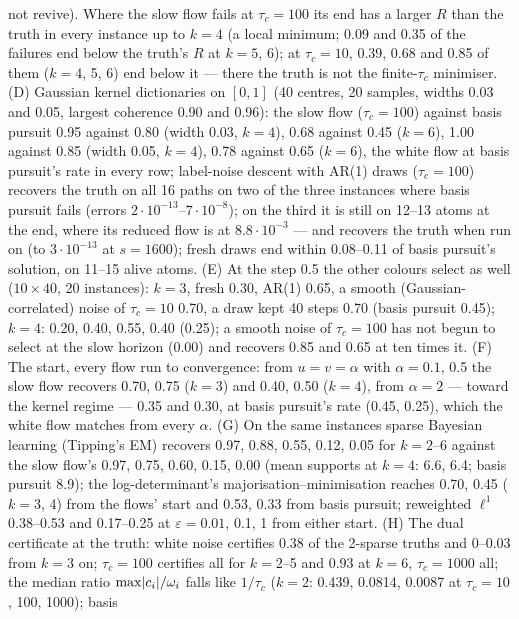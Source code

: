 \begin{sloppypar}
not revive). Where the slow flow fails at $\tau_c = 100$ its end has a larger $R$ than the truth in every instance up to
$k = 4$ (a local minimum; 0.09 and 0.35 of the failures end below the truth's $R$ at $k = 5$, 6); at $\tau_c = 10$,
0.39, 0.68 and 0.85 of them ($k = 4$, 5, 6) end below it --- there the truth is not the finite-$\tau_c$ minimiser. (D)
Gaussian kernel dictionaries on $[0,1]$ (40 centres, 20 samples, widths 0.03 and 0.05, largest coherence 0.90 and
0.96): the slow flow ($\tau_c = 100$) against basis pursuit 0.95 against 0.80 (width 0.03, $k = 4$), 0.68 against 0.45
($k = 6$), 1.00 against 0.85 (width 0.05, $k = 4$), 0.78 against 0.65 ($k = 6$), the white flow at basis pursuit's rate
in every row; label-noise descent with AR(1) draws ($\tau_c = 100$) recovers the truth on all 16 paths on two of the
three instances where basis pursuit fails (errors $2\cdot10^{-13}$--$7\cdot10^{-8}$); on the third it is still on
12--13 atoms at the end, where its reduced flow is at $8.8\cdot10^{-3}$ --- and recovers the truth when run on (to
$3\cdot10^{-13}$ at $s = 1600$); fresh draws end within 0.08--0.11 of basis pursuit's solution, on 11--15 alive atoms.
(E) At the step 0.5 the other colours select as well ($10\times40$, 20 instances): $k = 3$, fresh 0.30, AR(1) 0.65, a
smooth (Gaussian-correlated) noise of $\tau_c = 10$ 0.70, a draw kept 40 steps 0.70 (basis pursuit 0.45); $k = 4$:
0.20, 0.40, 0.55, 0.40 (0.25); a smooth noise of $\tau_c = 100$ has not begun to select at the slow horizon (0.00) and
recovers 0.85 and 0.65 at ten times it. (F) The start, every flow run to convergence: from $u = v = \alpha$ with
$\alpha = 0.1$, 0.5 the slow flow recovers 0.70, 0.75 ($k = 3$) and 0.40, 0.50 ($k = 4$), from $\alpha = 2$ --- toward
the kernel regime --- 0.35 and 0.30, at basis pursuit's rate (0.45, 0.25), which the white flow matches from every
$\alpha$. (G) On the same instances sparse Bayesian learning (Tipping's EM) recovers 0.97, 0.88, 0.55, 0.12, 0.05 for
$k = 2$--6 against the slow flow's 0.97, 0.75, 0.60, 0.15, 0.00 (mean supports at $k = 4$: 6.6, 6.4; basis pursuit
8.9); the log-determinant's majorisation--minimisation reaches 0.70, 0.45 ($k = 3$, 4) from the flows' start and 0.53,
0.33 from basis pursuit; reweighted $\ell^1$ 0.38--0.53 and 0.17--0.25 at $\varepsilon = 0.01$, 0.1, 1 from either
start. (H) The dual certificate at the truth: white noise certifies 0.38 of the 2-sparse truths and 0--0.03 from $k = 3$
on; $\tau_c = 100$ certifies all for $k = 2$--5 and 0.93 at $k = 6$, $\tau_c = 1000$ all; the median ratio
$\max\lvert c_i\rvert/\omega_i$ falls like $1/\tau_c$ ($k = 2$: 0.439, 0.0814, 0.0087 at $\tau_c = 10$, 100, 1000); basis

\end{sloppypar}
